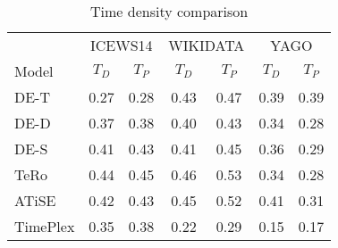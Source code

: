 \begin{table}[htb]
\centering
\begin{minipage}{0.95\columnwidth}
\centering
\caption{Time density comparison}
\vspace{-3mm}

\begin{tabular}{l|cc|cc|cc}\hline
 & \multicolumn{2}{c|}{ICEWS14} & \multicolumn{2}{c|}{WIKIDATA}& \multicolumn{2}{c}{YAGO} \\
Model & $T_D$ & $T_P$ & $T_D$ & $T_P$ & $T_D$ & $T_P$ \\ \hline
DE-T   & 
0.27    & 0.28   &
0.43    & 0.47   &
0.39    & 0.39   \\
DE-D &
0.37    & 0.38   &
0.40    & 0.43   &
0.34    & 0.28   \\
DE-S   &
0.41    & 0.43   &
0.41    & 0.45   &
0.36    & 0.29   \\
TeRo        & 
0.44    & 0.45   &
0.46    & 0.53   &
0.34    & 0.28   \\
ATiSE       & 
0.42    & 0.43   &
0.45    & 0.52   &
0.41    & 0.31   \\
TimePlex    &
0.35    & 0.38   &
0.22    & 0.29   &
0.15    & 0.17   \\ \hline
\end{tabular}

\label{fig:time_density_comparison}
\end{minipage}
\end{table}

